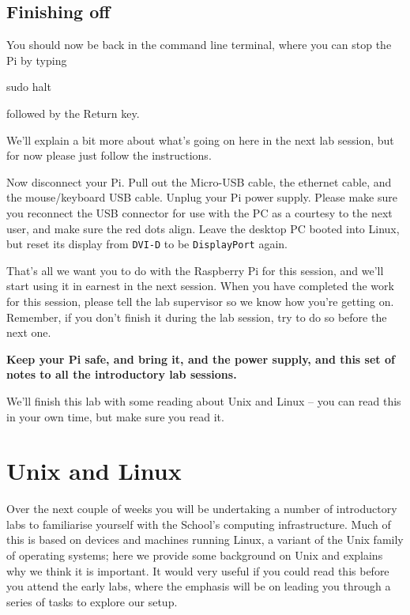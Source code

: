 \subsection{Finishing off}

You should now be back in the command line terminal, where you can stop the Pi by typing

\begin{ttoutenv}
sudo halt
\end{ttoutenv}

followed by the Return key.

\noindent We'll explain a bit more about what's going on here in the
next lab session, but for now please just follow the instructions.


Now disconnect your Pi. Pull out the Micro-USB cable, the ethernet
cable, and the mouse/keyboard USB cable. Unplug your Pi
power supply.  Please make sure you reconnect the USB connector for
use with the PC as a courtesy to the next user, and make sure the red
dots align. Leave the desktop PC booted into Linux, but reset its
display from \verb+DVI-D+ to be \verb+DisplayPort+ again.

That's all we want you to do with the Raspberry Pi for this session,
and we'll start using it in earnest in the next session.  When you
have completed the work for this session, please tell the lab
supervisor so we know how you're getting on. Remember, if you don't
finish it during the lab session, try to do so before the next
one.

\textbf{Keep your Pi safe, and bring it, and the power supply, and
  this set of notes to all the introductory lab sessions.}

We'll finish this lab with some reading about Unix and Linux -- you
can read this in your own time, but make sure you read it.

\section{Unix and Linux}
\label{sec:unix-linux}

Over the next couple of weeks you will be undertaking a number of
introductory labs to familiarise yourself with the School's computing
infrastructure. Much of this is based on devices and machines running Linux, a
variant of the Unix family of operating systems; here we
provide some background on Unix and explains why we think it is
important. It would very useful if you could read this before you
attend the early labs, where the emphasis will be on
leading you through a series of tasks to explore our setup.

